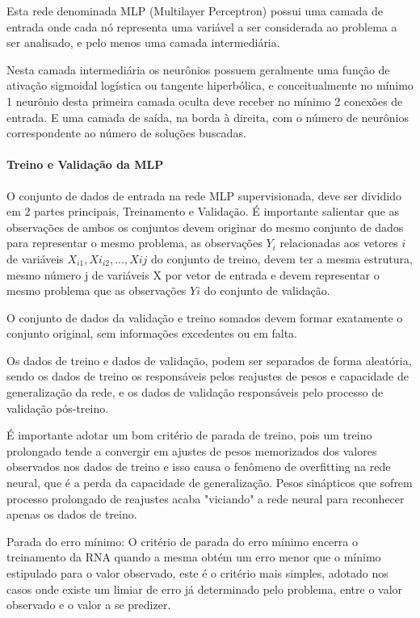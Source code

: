 \documentclass[	12pt, Times, openright, twoside, a4paper, english, brazil]{abntex2}
\begin{document}
  	       Esta rede denominada MLP (Multilayer Perceptron) possui uma camada de entrada onde cada nó representa uma variável a ser considerada ao problema a ser analisado, e pelo menos uma camada intermediária.
  	      
  	       Nesta camada intermediária os neurônios possuem geralmente uma função de ativação sigmoidal logística ou tangente hiperbólica, e conceitualmente no mínimo 1 neurônio desta primeira camada oculta deve receber no mínimo 2 conexões de entrada. E uma camada de saída, na borda à direita, com o número de neurônios correspondente ao número de soluções buscadas. 
  	       
            \paragraph*{Treino e Validação da MLP}
            	O conjunto de dados de entrada na rede MLP supervisionada, deve ser dividido em 2 partes principais, Treinamento e Validação. É importante salientar que as observações de ambos os conjuntos devem originar do mesmo conjunto de dados para representar o mesmo problema, as observações $Y_i$ relacionadas aos vetores $i$ de variáveis $X_{i1},Xi_{i2},...,X{ij}$ do conjunto de treino, devem ter a mesma estrutura, mesmo número j de variáveis X por vetor de entrada e devem representar o mesmo problema que as observações $Yi$ do conjunto de validação.
            	
            	O conjunto de dados da validação e treino somados devem formar exatamente o conjunto original, sem informações excedentes ou em falta.
            	
            	Os dados de treino e dados de validação, podem ser separados de forma aleatória, sendo os dados de treino os responsáveis pelos reajustes de pesos e capacidade de generalização da rede, e os dados de validação responsáveis pelo processo de validação pós-treino.
            	
            	É importante adotar um bom critério de parada de treino, pois um treino prolongado tende a convergir em ajustes de pesos memorizados dos valores observados nos dados de treino e isso causa o fenômeno de overfitting na rede neural, que é a perda da capacidade de generalização. Pesos sinápticos que sofrem processo prolongado de reajustes acaba "viciando" a rede neural para reconhecer apenas os dados de treino.
            	
            	Parada do erro mínimo:
            	O critério de parada do erro mínimo encerra o treinamento da RNA quando a mesma obtém um erro menor que o mínimo estipulado para o valor observado, este é o critério mais simples, adotado nos casos onde existe um limiar de erro já determinado pelo problema, entre o valor observado e o valor a se predizer.
            	
\end{document}
